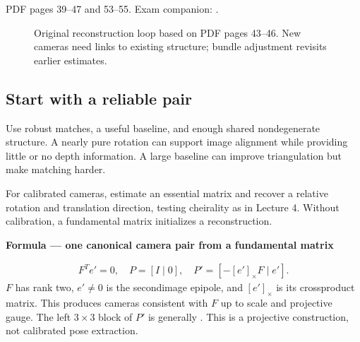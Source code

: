 \documentclass[letterpaper,11pt,english,openany,oneside]{jupyterBook}
\begin{document}
\sphinxAtStartPar
{} PDF pages 39–47 and 53–55. Exam companion: {\hyperref[\detokenize{lectures/lecture06/quiz-workbook:quiz-16-q1}]{}}.

\begin{figure}[H]
\centering
\capstart

\noindent{}
\caption{Original reconstruction loop based on PDF pages 43–46. New cameras need links to existing structure; bundle adjustment revisits earlier estimates.}\label{\detokenize{lectures/lecture06/pipeline:fig-lec06-pipeline}}\end{figure}


\subsection{Start with a reliable pair}
\label{\detokenize{lectures/lecture06/pipeline:start-with-a-reliable-pair}}
\sphinxAtStartPar
Use robust matches, a useful baseline, and enough shared nondegenerate structure. A nearly pure rotation can support image alignment while providing little or no depth information. A large baseline can improve triangulation but make matching harder.

\sphinxAtStartPar
For calibrated cameras, estimate an essential matrix and recover a relative rotation and translation direction, testing cheirality as in Lecture 4. Without calibration, a fundamental matrix initializes a  reconstruction.

\begin{TextbookBox}
\textbf{Formula — one canonical camera pair from a fundamental matrix}\par\smallskip
\begin{equation}\label{equation:lectures/lecture06/pipeline:eq-lec06-canonical}
\begin{split}F^Te'=0,\quad P=[I\mid0],\quad
P'=[-[e']_\times F\mid e'].\end{split}
\end{equation}
\sphinxAtStartPar
\(F\) has rank two, \(e'\ne0\) is the second\sphinxhyphen{}image epipole, and \([e']_\times\) is its cross\sphinxhyphen{}product matrix. This produces cameras consistent with \(F\) up to scale and projective gauge. The left \(3\times3\) block of \(P'\) is generally . This is a projective construction, not calibrated pose extraction.

\end{TextbookBox}
\end{document}
